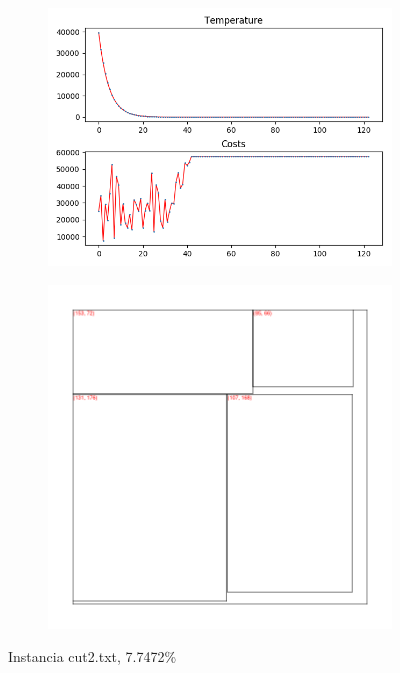 \begin{figure}
\centering
\begin{subfigure}{.5\textwidth}
  \centering
  \includegraphics[width=1\linewidth]{results/cut2/2/plot}
  \label{fig:sub1}
\end{subfigure}%
\begin{subfigure}{.5\textwidth}
  \centering
  \includegraphics[width=1\linewidth]{results/cut2/2/cut}
  \label{fig:sub2}
\end{subfigure}
\caption{Instancia cut2.txt, 7.7472\%}
\label{fig:test}
\end{figure}


